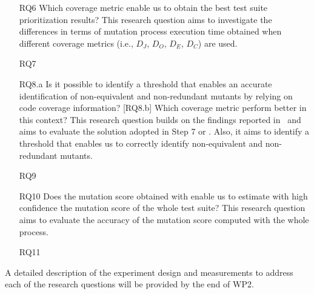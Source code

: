 \begin{itemize}
    \item[RQ6] Which coverage metric enable us to obtain the best test suite prioritization results? This research question aims to investigate the differences in terms of mutation process execution time obtained when different coverage metrics (i.e., $D_J$, $D_O$, $D_E$, $D_C$) are used.
    

    \item[RQ7] 

    \item[RQ8.a] Is it possible to identify a threshold that enables an accurate identification of non-equivalent and non-redundant mutants by relying on code coverage information? [RQ8.b] Which coverage metric perform better in this context? This research question builds on the findings reported in~\cite{schuler2013covering} and aims to evaluate the solution adopted in Step 7 or \APPR. Also, it aims to identify a threshold that enables us to correctly identify non-equivalent and non-redundant mutants.
    
    \item[RQ9] 

    \item[RQ10] Does the mutation score obtained with \APPR enable us to estimate with high confidence the mutation score of the whole test suite? This research question aims to evaluate the accuracy of the mutation score computed with the whole \APPR process.
    
    \item[RQ11] 

    
    
    
\end{itemize}

A detailed description of the experiment design and measurements to address each of the research questions will be provided by the end of WP2.